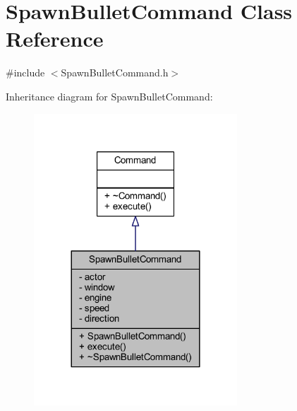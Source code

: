 \hypertarget{class_spawn_bullet_command}{}\section{Spawn\+Bullet\+Command Class Reference}
\label{class_spawn_bullet_command}


{\ttfamily \#include $<$Spawn\+Bullet\+Command.\+h$>$}



Inheritance diagram for Spawn\+Bullet\+Command\+:\nopagebreak
\begin{figure}[H]
\begin{center}
\leavevmode
\includegraphics[width=216pt]{class_spawn_bullet_command__inherit__graph}
\end{center}
\end{figure}


